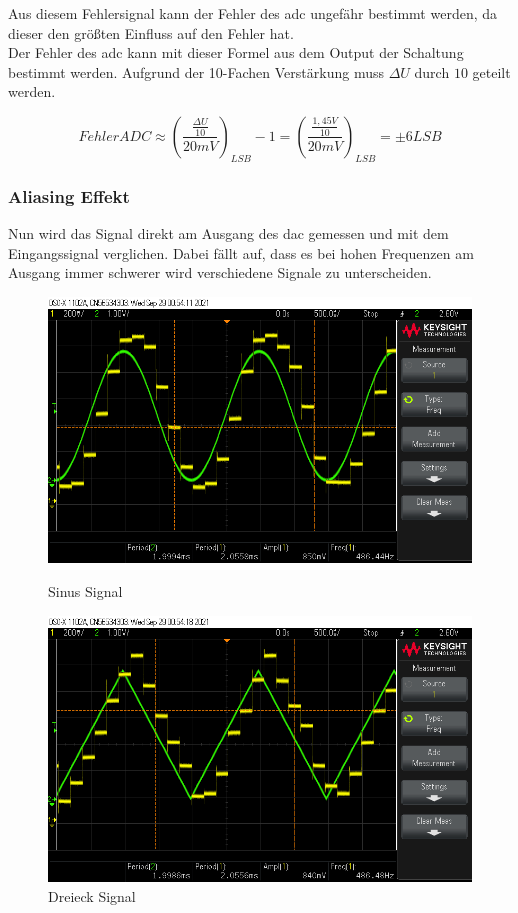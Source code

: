 \documentclass[12pt, a4paper, ngerman]{article}
\begin{document}
Aus diesem Fehlersignal kann der Fehler des \ac{adc} ungefähr bestimmt werden,
da dieser den größten Einfluss auf den Fehler hat. \\
Der Fehler des \ac{adc} kann mit dieser Formel aus dem Output der Schaltung bestimmt werden.
Aufgrund der 10-Fachen Verstärkung muss $\Delta U$ durch $10$ geteilt werden.

$$
  Fehler ADC \approx (\frac{\frac{\Delta U}{10}}{20mV})_{LSB}-1 = (\frac{\frac{1,45V}{10}}{20mV})_{LSB} = \pm 6 LSB
$$

\subsubsection{Aliasing Effekt}

Nun wird das Signal direkt am Ausgang des \ac{dac} gemessen und mit dem Eingangssignal verglichen.
Dabei fällt auf, dass es bei hohen Frequenzen am Ausgang immer schwerer wird verschiedene Signale zu unterscheiden.

\begin{figure}%
  \centering
  \begin{minipage}[b]{0.49\textwidth}
    \includegraphics[width=\textwidth]{scope_49.png}
    \caption{Sinus Signal}
    \label{abb:aliasSin}
  \end{minipage}
  \hfill
  \begin{minipage}[b]{0.49\textwidth}
    \includegraphics[width=\textwidth]{scope_50.png}
    \caption{Dreieck Signal}
    \label{abb:aliasTri}
  \end{minipage}
\end{figure}
\end{document}
